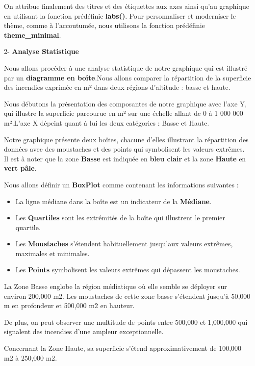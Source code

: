\documentclass[
]{article}
\begin{document}
On attribue finalement des titres et des étiquettes aux axes ainsi qu'au
graphique en utilisant la fonction prédéfinie \textbf{labs()}. Pour
personnaliser et moderniser le thème, comme à l'accoutumée, nous
utilisons la fonction prédéfinie \textbf{theme\_minimal}.

2- \textbf{Analyse Statistique}

Nous allons procéder à une analyse statistique de notre graphique qui
est illustré par un \textbf{diagramme en boîte}.Nous allons comparer la
répartition de la superficie des incendies exprimée en m² dans deux
régions d'altitude : basse et haute.

Nous débutons la présentation des composantes de notre graphique avec
l'axe Y, qui illustre la superficie parcourue en m² sur une échelle
allant de 0 à 1 000 000 m².L'axe X dépeint quant à lui les deux
catégories : Basse et Haute.

Notre graphique présente deux boîtes, chacune d'elles illustrant la
répartition des données avec des moustaches et des points qui
symbolisent les valeurs extrêmes. Il est à noter que la zone
\textbf{Basse} est indiquée en \textbf{bleu clair} et la zone
\textbf{Haute} en \textbf{vert pâle}.

Nous allons définir un \textbf{BoxPlot} comme contenant les informations
suivantes :

\begin{itemize}
\item
  La ligne médiane dans la boîte est un indicateur de la
  \textbf{Médiane}.
\item
  Les \textbf{Quartiles} sont les extrémités de la boîte qui illustrent
  le premier quartile.
\item
  Les \textbf{Moustaches} s'étendent habituellement jusqu'aux valeurs
  extrêmes, maximales et minimales.
\item
  Les \textbf{Points} symbolisent les valeurs extrêmes qui dépassent les
  moustaches.
\end{itemize}

La Zone Basse englobe la région médiatique où elle semble se déployer
sur environ 200,000 m2. Les moustaches de cette zone basse s'étendent
jusqu'à 50,000 m en profondeur et 500,000 m2 en hauteur.

De plus, on peut observer une multitude de points entre 500,000 et
1,000,000 qui signalent des incendies d'une ampleur exceptionnelle.

Concernant la Zone Haute, sa superficie s'étend approximativement de
100,000 m2 à 250,000 m2.
\end{document}

